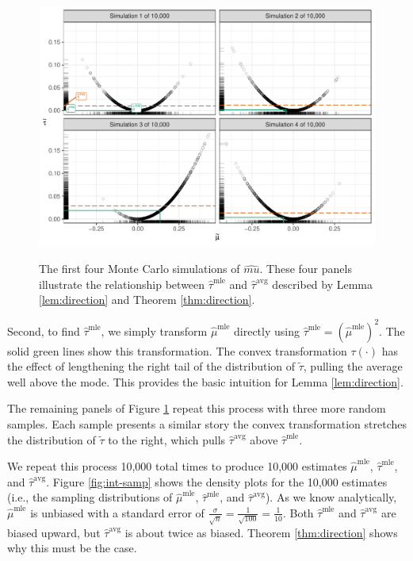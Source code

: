 \documentclass[11pt]{article}
\begin{document}
\begin{figure}[h]
\begin{center}
\includegraphics[width = \textwidth]{figs/intuition.pdf}\\
\vspace{.1in}
\caption{The first four Monte Carlo simulations of $\hat{mu}$. These four panels illustrate the relationship between $\hat{\tau}^\text{mle}$ and $\hat{\tau}^\text{avg}$ described by Lemma \ref{lem:direction} and Theorem \ref{thm:direction}.}\label{fig:samp}
\end{center}
\end{figure}

Second, to find $\hat{\tau}^\text{mle}$, we simply transform $\hat{\mu}^\text{mle}$ directly using $\hat{\tau}^\text{mle} = \left( \hat{\mu}^\text{mle} \right) ^2$.
The solid green lines show this transformation.
The convex transformation $\tau(\cdot)$ has the effect of lengthening the right tail of the distribution of $\tilde{\tau}$, pulling the average well above the mode.
This provides the basic intuition for Lemma \ref{lem:direction}.

The remaining panels of Figure \ref{fig:samp} repeat this process with three more random samples.
Each sample presents a similar story \textemdash{} the convex transformation stretches the distribution of $\tilde{\tau}$ to the right, which pulls $\hat{\tau}^\text{avg}$ above $\hat{\tau}^\text{mle}$.

We repeat this process 10,000 total times to produce 10,000 estimates $\hat{\mu}^\text{mle}$, $\hat{\tau}^\text{mle}$, and $\hat{\tau}^\text{avg}$.
Figure \ref{fig:int-samp} shows the density plots for the 10,000 estimates (i.e., the sampling distributions of $\hat{\mu}^\text{mle}$, $\hat{\tau}^\text{mle}$, and $\hat{\tau}^\text{avg}$).
As we know analytically, $\hat{\mu}^\text{mle}$ is unbiased with a standard error of $\frac{\sigma}{\sqrt{n}} = \frac{1}{\sqrt{100}} = \frac{1}{10}$.
Both $\hat{\tau}^\text{mle}$ and $\hat{\tau}^\text{avg}$ are biased upward, but $\hat{\tau}^\text{avg}$ is about twice as biased.
Theorem \ref{thm:direction} shows why this must be the case.
\end{document}
